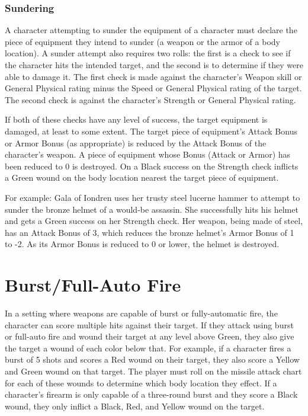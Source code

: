 \documentclass[oneside]{book}
\begin{document}
\begin{multicols}{2}
\subsubsection{Sundering}
A character attempting to sunder the equipment of a character must declare the piece of equipment they intend to sunder (a weapon or the armor of a body location). A sunder attempt also requires two rolls: the first is a check to see if the character hits the intended target, and the second is to determine if they were able to damage it. The first check is made against the character's Weapon skill or General Physical rating minus the Speed or General Physical rating of the target. The second check is against the character's Strength or General Physical rating. 

If both of these checks have any level of success, the target equipment is damaged, at least to some extent. The target piece of equipment's Attack Bonus or Armor Bonus (as appropriate) is reduced by the Attack Bonus of the character's weapon. A piece of equipment whose Bonus (Attack or Armor) has been reduced to 0 is destroyed. On a Black success on the Strength check inflicts a Green wound on the body location nearest the target piece of equipment.  

For example: Gala of Iondren uses her trusty steel lucerne hammer to attempt to sunder the bronze helmet of a would-be assassin. She successfully hits his helmet and gets a Green success on her Strength check. Her weapon, being made of steel, has an Attack Bonus of 3, which reduces the bronze helmet's Armor Bonus of 1 to -2. As its Armor Bonus is reduced to 0 or lower, the helmet is destroyed. 

\section{Burst/Full-Auto Fire}
In a setting where weapons are capable of burst or fully-automatic fire, the character can score multiple hits against their target. If they attack using burst or full-auto fire and wound their target at any level above Green, they also give the target a wound of each color below that. For example, if a character fires a burst of 5 shots and scores a Red wound on their target, they also score a Yellow and Green wound on that target. The player must roll on the missile attack chart for each of these wounds to determine which body location they effect. If a character's firearm is only capable of a three-round burst and they score a Black wound, they only inflict a Black, Red, and Yellow wound on the target. 

\end{multicols}
\end{document}
